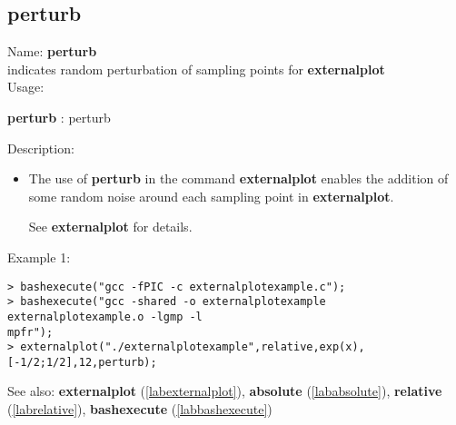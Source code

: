 \subsection{perturb}
\label{labperturb}
\noindent Name: \textbf{perturb}\\
indicates random perturbation of sampling points for \textbf{externalplot}\\
\noindent Usage: 
\begin{center}
\textbf{perturb} : \textsf{perturb}\\
\end{center}
\noindent Description: \begin{itemize}

\item The use of \textbf{perturb} in the command \textbf{externalplot} enables the addition
   of some random noise around each sampling point in \textbf{externalplot}.
    
   See \textbf{externalplot} for details.
\end{itemize}
\noindent Example 1: 
\begin{center}\begin{minipage}{15cm}\begin{Verbatim}[frame=single]
> bashexecute("gcc -fPIC -c externalplotexample.c");
> bashexecute("gcc -shared -o externalplotexample externalplotexample.o -lgmp -l
mpfr");
> externalplot("./externalplotexample",relative,exp(x),[-1/2;1/2],12,perturb);
\end{Verbatim}
\end{minipage}\end{center}
See also: \textbf{externalplot} (\ref{labexternalplot}), \textbf{absolute} (\ref{lababsolute}), \textbf{relative} (\ref{labrelative}), \textbf{bashexecute} (\ref{labbashexecute})
